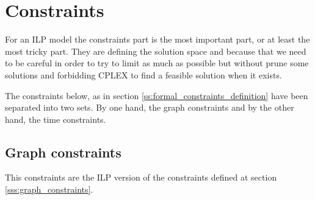 \documentclass[]{report}
\begin{document}
\section{Constraints}\label{s:ilp_constraints}

For an ILP model the constraints part is the most important part, or at least the most tricky part. They are defining the solution space and because that we need to be careful in order to try to limit as much as possible but without prune some solutions and forbidding CPLEX to find a feasible solution when it exists.

The constraints below, as in section \ref{ss:formal_constraints_definition} have been separated into two sets. By one hand, the graph constraints and by the other hand, the time constraints.

\subsection{Graph constraints}

This constraints are the ILP version of the constraints defined at section \ref{sss:graph_constraints}.
\end{document}
